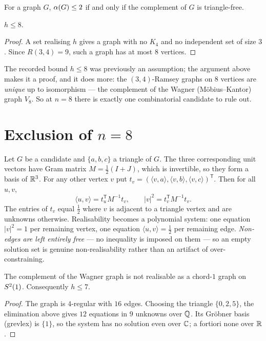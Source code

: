 \begin{lemma}
For a graph $G$, $\alpha(G)\le2$ if and only if the complement of $G$ is
triangle-free.
\end{lemma}

\begin{theorem}
$h\le8$.
\end{theorem}

\begin{proof}
A set realising $h$ gives a graph with no $K_4$ and no independent set of size
$3$. Since $R(3,4)=9$, such a graph has at most $8$ vertices.
\end{proof}

The recorded bound $h\le8$ was previously an assumption; the argument above
makes it a proof, and it does more: the $(3,4)$-Ramsey graphs on $8$ vertices
are \emph{unique} up to isomorphism --- the complement of the Wagner
(M\"obius--Kantor) graph $V_8$. So at $n=8$ there is exactly one combinatorial
candidate to rule out.

\section{Exclusion of $n=8$}

Let $G$ be a candidate and $\{a,b,c\}$ a triangle of $G$. The three
corresponding unit vectors have Gram matrix $M=\tfrac12(I+J)$, which is
invertible, so they form a basis of $\mathbb{R}^3$. For any other vertex $v$ put
$t_v=(\langle v,a\rangle,\langle v,b\rangle,\langle v,c\rangle)^{\mathsf T}$.
Then for all $u,v$,
\[
\langle u,v\rangle=t_u^{\mathsf T}M^{-1}t_v,\qquad
|v|^2=t_v^{\mathsf T}M^{-1}t_v .
\]
The entries of $t_v$ equal $\tfrac12$ where $v$ is adjacent to a triangle vertex
and are unknowns otherwise. Realisability becomes a polynomial system: one
equation $|v|^2=1$ per remaining vertex, one equation $\langle
u,v\rangle=\tfrac12$ per remaining edge. \emph{Non-edges are left entirely
free} --- no inequality is imposed on them --- so an empty solution set is
genuine non-realisability rather than an artifact of over-constraining.

\begin{theorem}
The complement of the Wagner graph is not realisable as a chord-$1$ graph on
$S^2(1)$. Consequently $h\le7$.
\end{theorem}

\begin{proof}
The graph is $4$-regular with $16$ edges. Choosing the triangle $\{0,2,5\}$, the
elimination above gives $12$ equations in $9$ unknowns over $\mathbb{Q}$. Its Gr\"obner
basis (grevlex) is $\{1\}$, so the system has no solution even over $\mathbb{C}$; a
fortiori none over $\mathbb{R}$.
\end{proof}

